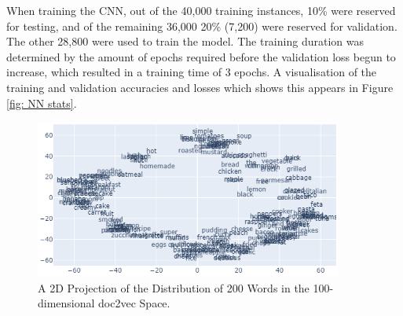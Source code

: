\documentclass[twocolumn, 11pt]{article}
\begin{document}
When training the CNN, out of the 40,000 training instances, 10\% were reserved for testing, and of the remaining 36,000 20\% (7,200) were reserved for validation. The other 28,800 were used to train the model. The training duration was determined by the amount of epochs required before the validation loss begun to increase, which resulted in a training time of 3 epochs. A visualisation of the training and validation accuracies and losses which shows this appears in Figure \ref{fig: NN stats}.
\printbibliography
\newpage
\onecolumn
\null
\vfill
\begin{figure}[ht]
    \centering
    \includegraphics[width=0.9\textwidth]{doc2vec-visualisation.png}
    \caption{A 2D Projection of the Distribution of 200 Words in the 100-dimensional doc2vec Space.}
    \label{fig: doc2vec}
\end{figure}
\vfill
\end{document}
